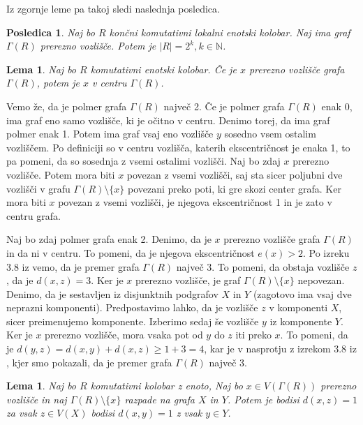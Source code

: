 \documentclass[a4paper, 12pt]{amsart}
\theoremstyle{definition} %
\theoremstyle{plain} %
\newtheorem{lema}[definicija]{Lema}
\newtheorem{posledica}[definicija]{Posledica}
\newcommand{\N}{\mathbb N}
\begin{document}
Iz zgornje leme pa takoj sledi naslednja posledica.

\begin{posledica}
Naj bo $R$ končni komutativni lokalni enotski kolobar. Naj ima graf $\Gamma(R)$ prerezno vozlišče. Potem je $|R| = 2^k, k\in \N$.
\end{posledica}

\begin{lema}
Naj bo $R$ komutativni enotski kolobar. Če je $x$ prerezno vozlišče grafa $\Gamma(R)$, potem  je $x$ v centru $\Gamma(R)$.
\end{lema}

\proof
Vemo že, da je polmer grafa $\Gamma(R)$ največ 2.
Če je polmer grafa $\Gamma(R)$ enak 0, ima graf eno samo vozlišče, ki je očitno v centru. Denimo torej, da ima graf polmer enak 1. Potem ima graf vsaj eno vozlišče $y$ sosedno vsem ostalim vozliščem. Po definiciji so v centru vozlišča, katerih ekscentričnost je enaka 1, to pa pomeni, da so sosednja z vsemi ostalimi vozlišči. Naj bo zdaj $x$ prerezno vozlišče. Potem mora biti $x$ povezan z vsemi vozlišči, saj sta sicer poljubni dve vozlišči v grafu $\Gamma(R)\setminus \{x\}$ povezani preko poti, ki gre skozi center grafa. Ker mora biti $x$ povezan z vsemi vozlišči, je njegova ekscentričnost 1 in je zato v centru grafa.

Naj bo zdaj polmer grafa enak 2. Denimo, da je $x$ prerezno vozlišče grafa $\Gamma(R)$ in da ni v centru. To pomeni, da je njegova ekscentričnost $e(x) > 2$. Po izreku 3.8 iz \cite{diploma} vemo, da je premer grafa $\Gamma(R)$ največ 3. To pomeni, da obstaja vozlišče $z$, da je $d(x,z) = 3$. Ker je $x$ prerezno vozlišče, je graf $\Gamma(R) \setminus \{x\}$ nepovezan. Denimo, da je sestavljen iz disjunktnih podgrafov $X$ in $Y$ (zagotovo ima vsaj dve neprazni komponenti). Predpostavimo lahko, da je vozlišče $z$ v komponenti $X$, sicer preimenujemo komponente. Izberimo sedaj še vozlišče $y$ iz komponente $Y$. Ker je $x$ prerezno vozlišče, mora vsaka pot od $y$ do $z$ iti preko $x$. To  pomeni, da je $d(y,z) = d(x,y) + d(x,z) \ge 1 + 3 = 4$, kar je v nasprotju z izrekom 3.8 iz \cite{diploma}, kjer smo pokazali, da je premer grafa $\Gamma(R)$ največ 3.  
\endproof

\begin{lema}
Naj bo $R$ komutativni kolobar z enoto, Naj bo $x\in V(\Gamma(R))$ prerezno vozlišče in naj $\Gamma(R) \setminus \{x\}$ razpade na grafa $X$ in $Y$. Potem je bodisi $d(x,z)= 1$ za vsak $z\in V(X)$ bodisi $d(x,y) = 1$ z vsak $y\in Y$.
\end{lema}
\end{document}
